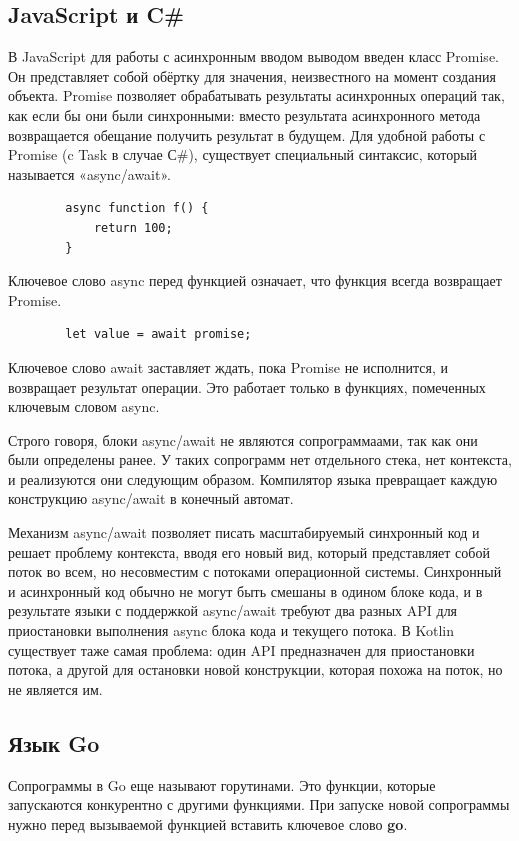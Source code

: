 	\subsection{JavaScript и C\#}
	В JavaScript для работы с асинхронным вводом выводом введен класс Promise.
	Он представляет собой обёртку для значения, неизвестного на момент создания объекта. 
	Promise позволяет обрабатывать результаты асинхронных операций так, как если бы они были синхронными:
	вместо результата асинхронного метода возвращается обещание получить результат в будущем.
	Для удобной работы с Promise (c Task в случае С\#), существует специальный синтаксис, который называется «async/await». 
	
	\begin{lstlisting}
		async function f() {
			return 100;
		}
	\end{lstlisting}

	Ключевое слово async перед функцией означает, что функция всегда возвращает Promise.
	
	\begin{lstlisting}
		let value = await promise;
	\end{lstlisting}
	Ключевое слово await заставляет ждать, пока Promise не исполнится, и возвращает результат операции. Это работает только в функциях, помеченных ключевым словом async. 
	\par
	Строго говоря, блоки async/await не являются сопрограммаами, так как они были определены ранее. У таких сопрограмм нет отдельного
	стека, нет контекста, и реализуются они следующим образом. Компилятор языка превращает каждую конструкцию async/await
	в конечный автомат.
	
	Механизм async/await позволяет писать масштабируемый синхронный код и решает проблему контекста, вводя
	его	новый вид, который представляет собой поток во всем, но несовместим с потоками операционной
	системы. Синхронный и асинхронный код обычно не могут быть смешаны в одином блоке кода, и в
	результате языки с поддержкой async/await требуют два разных API для приостановки выполнения async
	блока кода и текущего потока. В Kotlin существует таже самая проблема: один API предназначен для
	приостановки потока, а другой для остановки новой конструкции, которая похожа на поток, но не является им.
	\clearpage
	
	\subsection{Язык Go}
	Сопрограммы в Go еще называют горутинами. Это функции, которые запускаются конкурентно с другими функциями. 
	При запуске новой сопрограммы нужно перед вызываемой функцией вставить ключевое слово \textbf{go}.
	
